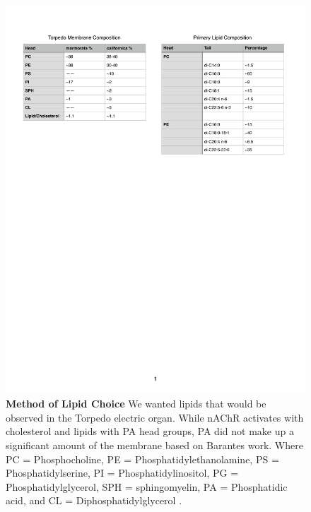 \documentclass[10pt, letterpaper]{article}
\begin{document}
\begin{figure}[H]
   \centerline{\includegraphics[width=\textwidth,scale=0.75]{Lipid_Bara.pdf}}
   
   \caption[Method of Lipid Choice]{\textbf{Method of Lipid Choice} We wanted lipids that would be observed in the Torpedo electric organ. While nAChR activates with cholesterol and lipids with PA head groups, PA did not make up a significant amount of the membrane based on Barantes work. Where PC = Phosphocholine, PE = Phosphatidylethanolamine, PS = Phosphatidylserine, PI = Phosphatidylinositol, PG = Phosphatidylglycerol, SPH = sphingomyelin, PA = Phosphatidic acid, and CL = Diphosphatidylglycerol \cite{barrantesthe1989}.
}\label{fig:lchart1}

\end{figure}
\newpage
\end{document}
